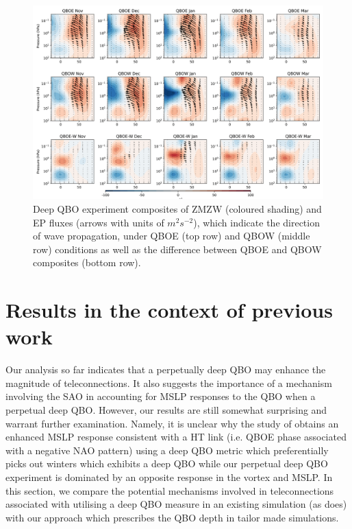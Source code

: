\begin{figure}[h!]
\begin{center}
\noindent\includegraphics[width = \linewidth]{Figures/Figures-deepQBO/EP_flux_composites_by_month_QBO_phases_d_higher_MarQBO_vs_Mar_30hPa_5thresh.png}
\caption[]{Deep QBO experiment composites of ZMZW (coloured shading) and EP fluxes (arrows with units of $m^2s^{-2}$), which indicate the direction of wave propagation, under QBOE (top row) and QBOW (middle row) conditions as well as the difference between QBOE and QBOW composites (bottom row).}
\label{fig:EP_deep}
\end{center}
\end{figure}
\newpage

\section{Results in the context of previous work}
Our analysis so far indicates that a perpetually deep QBO may enhance the magnitude of teleconnections. It also suggests the importance of a mechanism involving the SAO in accounting for MSLP responses to the QBO when a perpetual deep QBO. However, our results are still somewhat surprising and warrant further examination. Namely, it is unclear why the study of \cite{andrewsObserved2019d} obtains an enhanced MSLP response consistent with a HT link (i.e. QBOE phase associated with a negative NAO pattern) using a deep QBO metric which preferentially picks out winters which exhibits a deep QBO while our perpetual deep QBO experiment is dominated by an opposite response in the vortex and MSLP. In this section, we compare the potential mechanisms involved in teleconnections associated with utilising a deep QBO measure in an existing simulation (as \cite{andrewsObserved2019d} does) with our approach which prescribes the QBO depth in tailor made simulations. 

